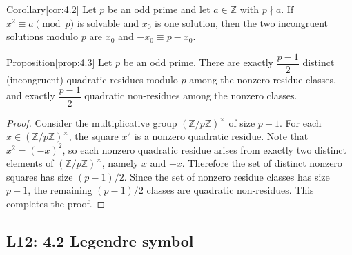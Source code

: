 \documentclass[10pt]{article}
\theoremstyle{definition}
\theoremstyle{plain}
\numberwithin{equation}{section}
\begin{document}
\begin{define}{Corollary}[cor:4.2]
Let $p$ be an odd prime and let $a\in\mathbb{Z}$ with $p\nmid a$. If
$x^2\equiv a\pmod p$ is solvable and $x_0$ is one solution, then the two
incongruent solutions modulo $p$ are $x_0$ and $-x_0\equiv p-x_0$.
\end{define}

\begin{define}{Proposition}[prop:4.3]
Let $p$ be an odd prime. There are exactly $\dfrac{p-1}{2}$ distinct
(incongruent) quadratic residues modulo $p$ among the nonzero residue
classes, and exactly $\dfrac{p-1}{2}$ quadratic non-residues among the
nonzero classes.
\end{define}

\begin{proof}
Consider the multiplicative group $(\mathbb{Z}/p\mathbb{Z})^\times$ of size
$p-1$. For each $x\in(\mathbb{Z}/p\mathbb{Z})^\times$, the square $x^2$ is a
nonzero quadratic residue. Note that $x^2 = (-x)^2$, so each nonzero quadratic
residue arises from exactly two distinct elements of $(\mathbb{Z}/p\mathbb{Z})^\times$,
namely $x$ and $-x$. Therefore the set of distinct nonzero squares has size
$(p-1)/2$. Since the set of nonzero residue classes has size $p-1$, the
remaining $(p-1)/2$ classes are quadratic non-residues. This completes the
proof.
\end{proof}








\newpage
\subsection{L12: 4.2 Legendre symbol}
\end{document}
